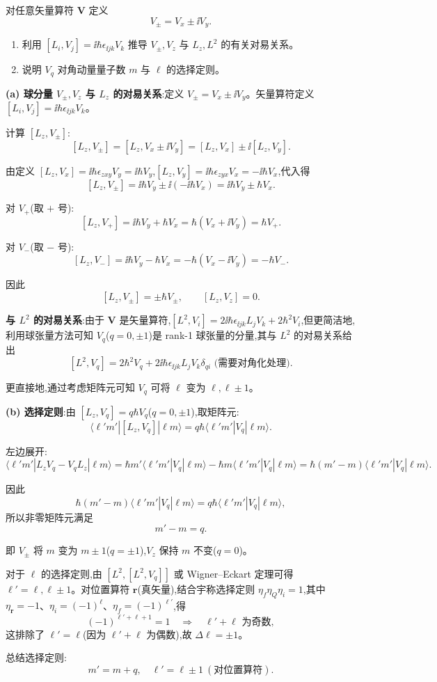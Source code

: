 \begin{question}
对任意矢量算符 $\mathbf V$ 定义
\[
V_\pm=V_x\pm\ii V_y.
\]
\begin{enumerate}
\item 利用 $[L_i,V_j]=\ii\hbar\epsilon_{\ii jk}V_k$ 推导 $V_\pm,V_z$ 与 $L_z,L^2$ 的有关对易关系。
\item 说明 $V_q$ 对角动量量子数 $m$ 与 $\ell$ 的选择定则。
\end{enumerate}
\begin{solution}
	\textbf{(a) 球分量 $V_\pm,V_z$ 与 $L_z$ 的对易关系}:定义 $V_\pm = V_x \pm \ii V_y$。矢量算符定义 $[L_i,V_j]=\ii\hbar\epsilon_{\ii jk}V_k$。

	计算 $[L_z,V_\pm]$:
	\[
	[L_z,V_\pm] = [L_z,V_x\pm\ii V_y] = [L_z,V_x]\pm\ii[L_z,V_y].
	\]

	由定义 $[L_z,V_x]=\ii\hbar\epsilon_{zxy}V_y = \ii\hbar V_y$,$[L_z,V_y]=\ii\hbar\epsilon_{zyx}V_x = -\ii\hbar V_x$,代入得
	\[
	[L_z,V_\pm] = \ii\hbar V_y \pm \ii(-\ii\hbar V_x) = \ii\hbar V_y \pm \hbar V_x.
	\]

	对 $V_+$(取 $+$ 号):
	\[
	[L_z,V_+] = \ii\hbar V_y + \hbar V_x = \hbar(V_x+\ii V_y) = \hbar V_+.
	\]

	对 $V_-$(取 $-$ 号):
	\[
	[L_z,V_-] = \ii\hbar V_y - \hbar V_x = -\hbar(V_x-\ii V_y) = -\hbar V_-.
	\]

	因此
	\[
	[L_z,V_\pm] = \pm\hbar V_\pm,\qquad [L_z,V_z]=0.
	\]

	\textbf{与 $L^2$ 的对易关系}:由于 $\mathbf V$ 是矢量算符,$[L^2,V_i]=2\ii\hbar\epsilon_{\ii jk}L_jV_k + 2\hbar^2 V_i$,但更简洁地,利用球张量方法可知 $V_q$($q=0,\pm1$)是 rank-1 球张量的分量,其与 $L^2$ 的对易关系给出
	\[
	[L^2,V_q] = 2\hbar^2 V_q + 2\ii\hbar\epsilon_{\ii jk}L_jV_k\delta_{qi} \text{ (需要对角化处理)}.
	\]

	更直接地,通过考虑矩阵元可知 $V_q$ 可将 $\ell$ 变为 $\ell,\ell\pm1$。

	\textbf{(b) 选择定则}:由 $[L_z,V_q]=q\hbar V_q$($q=0,\pm1$),取矩阵元:
	\[
	\langle \ell'm'|[L_z,V_q]|\ell m\rangle = q\hbar\langle \ell'm'|V_q|\ell m\rangle.
	\]

	左边展开:
	\[
	\langle \ell'm'|L_zV_q - V_qL_z|\ell m\rangle
	= \hbar m'\langle \ell'm'|V_q|\ell m\rangle - \hbar m\langle \ell'm'|V_q|\ell m\rangle
	= \hbar(m'-m)\langle \ell'm'|V_q|\ell m\rangle.
	\]

	因此
	\[
	\hbar(m'-m)\langle \ell'm'|V_q|\ell m\rangle = q\hbar\langle \ell'm'|V_q|\ell m\rangle,
	\]
	所以非零矩阵元满足
	\[
	m' - m = q.
	\]

	\noindent 即 $V_\pm$ 将 $m$ 变为 $m\pm1$($q=\pm1$),$V_z$ 保持 $m$ 不变($q=0$)。

	对于 $\ell$ 的选择定则,由 $[L^2,[L^2,V_q]]$ 或 Wigner--Eckart 定理可得 $\ell' = \ell,\ell\pm1$。对位置算符 $\mathbf r$(真矢量),结合宇称选择定则 $\eta_f\eta_Q\eta_i=1$,其中 $\eta_\mathbf r=-1$、$\eta_i=(-1)^\ell$、$\eta_f=(-1)^{\ell'}$,得
	\[
	(-1)^{\ell'+\ell+1}=1 \quad\Longrightarrow\quad \ell'+\ell \text{ 为奇数},
	\]
	这排除了 $\ell'=\ell$(因为 $\ell'+\ell$ 为偶数),故 $\Delta\ell = \pm1$。

	总结选择定则:
	\[
	\boxed{m' = m+q,\quad \ell' = \ell\pm1\ (\text{对位置算符})}.
	\]
	\end{solution}
\end{question}

